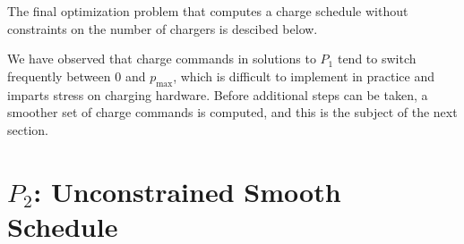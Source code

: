 \par The final optimization problem that computes a charge schedule without constraints on the number of chargers is descibed below.\\[0.1in]

\par We have observed that charge commands in solutions to $P_1$ tend to switch frequently between $0$ and $p_{\text{max}}$, which is difficult to implement in practice and imparts stress on charging hardware. Before additional steps can be taken, a smoother set of charge commands is computed, and this is the subject of the next section.

\section{$P_2$: Unconstrained Smooth Schedule \label{sec:unconstrainedSmoothSchedule}}

